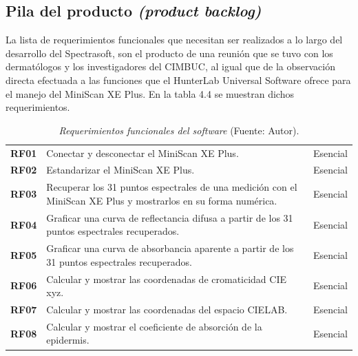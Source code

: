 \subsection{Pila del producto \textit{(product backlog)}}
	La lista de requerimientos funcionales que necesitan ser realizados a lo largo del desarrollo del Spectrasoft, son el producto de una reuni\'{o}n que se tuvo con los dermat\'{o}logos y los investigadores del CIMBUC, al igual que de la observaci\'{o}n directa efectuada a las funciones que el HunterLab Universal Software ofrece para el manejo del MiniScan XE Plus. En la tabla 4.4 se muestran dichos requerimientos.
	
	\begin{table}[h]
		\small
		\caption[Requerimientos funcionales del software]{\textit{Requerimientos funcionales del software} (Fuente: Autor).}
		\centering
		\setlength{\extrarowheight}{\altocelda}
		\begin{tabulary}{\anchotabla}{|c|J|c|}
			\hline
			 &  & \\ \hline
			
			\textbf{RF01} & Conectar y desconectar el MiniScan XE Plus. & Esencial\\ \hline
			
			\textbf{RF02} & Estandarizar el MiniScan XE Plus. & Esencial\\ \hline
			
			\textbf{RF03} & Recuperar los 31 puntos espectrales de una medici\'{o}n con el MiniScan XE Plus y mostrarlos en su forma num\'{e}rica. & Esencial\\ \hline

			\textbf{RF04} & Graficar una curva de reflectancia difusa a partir de los 31 puntos espectrales recuperados. & Esencial\\ \hline
			\textbf{RF05} & Graficar una curva de absorbancia aparente a partir de los 31 puntos espectrales recuperados. & Esencial\\ \hline
			\textbf{RF06} & Calcular y mostrar las coordenadas de cromaticidad CIE xyz. & Esencial\\ \hline
			
			\textbf{RF07} & Calcular y mostrar las coordenadas del espacio CIELAB. & Esencial\\ \hline

			\textbf{RF08} & Calcular y mostrar el coeficiente de absorci\'{o}n de la epidermis. & Esencial\\ \hline


\end{tabulary}
\end{table}
